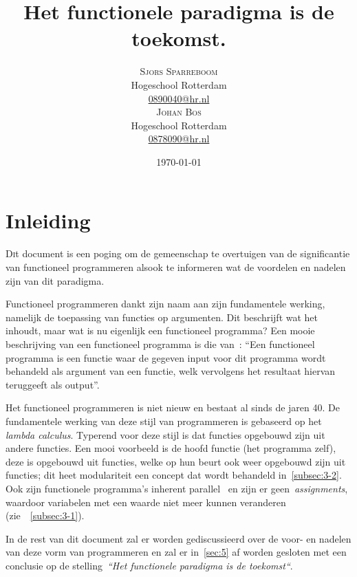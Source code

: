\documentclass[twoside,twocolumn]{article}
\title{Het functionele paradigma is de toekomst.} %
\author{%
  \textsc{Sjors Sparreboom} \\[1ex] %
\normalsize Hogeschool Rotterdam \\ %
\normalsize \href{mailto:0890040@hr.nl}{0890040@hr.nl} \\[2ex] %
\textsc{Johan Bos} \\[1ex] %
\normalsize Hogeschool Rotterdam \\ %
\normalsize \href{mailto:0878090@hr.nl}{0878090@hr.nl} %
}
\date{\today} %
\begin{document}
\nocite{*}

\maketitle


\section{Inleiding}
\label{sec:1}
\lettrine[nindent=0em,lines=3]{D}it document is een poging om de gemeenschap te
overtuigen van de significantie van functioneel programmeren alsook te
informeren wat de voordelen en nadelen zijn van dit paradigma.

Functioneel programmeren dankt zijn naam aan zijn fundamentele werking,
namelijk de toepassing van functies op argumenten. Dit beschrijft wat
het inhoudt, maar wat is nu eigenlijk een functioneel programma? Een
mooie beschrijving van een functioneel programma is die van~\textcite{src1}:
\enquote{Een functioneel programma is een functie waar de gegeven input voor
dit programma wordt behandeld als argument van een functie, welk vervolgens het
resultaat hiervan teruggeeft als output}.

Het functioneel programmeren is niet nieuw en bestaat al sinds de jaren 40. De
fundamentele werking van deze stijl van programmeren is gebaseerd op
het \textit{lambda calculus}\cite{src2,src3}. Typerend voor deze stijl is dat
functies opgebouwd zijn uit andere functies. Een mooi voorbeeld is de hoofd
functie (het programma zelf), deze is opgebouwd uit functies, welke op hun
beurt ook weer opgebouwd zijn uit functies; dit heet modulariteit een concept
dat wordt behandeld in~\cref{subsec:3-2}. Ook zijn functionele programma's
inherent parallel~\cite{src4,src12} en zijn er geen~\textit{assignments},
waardoor variabelen met een waarde niet meer kunnen veranderen
(zie~~\cref{subsec:3-1}).

In de rest van dit document zal er worden gediscussieerd over de voor- en
nadelen van deze vorm van programmeren en zal er in~\cref{sec:5} af worden
gesloten met een conclusie op de stelling~\textit{``Het functionele paradigma
is de toekomst``}.

\end{document}
